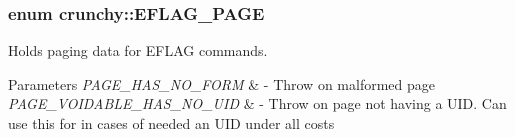 \subsubsection[{E\+F\+L\+A\+G\+\_\+\+P\+A\+G\+E}]{\setlength{\rightskip}{0pt plus 5cm}enum {\bf crunchy\+::\+E\+F\+L\+A\+G\+\_\+\+P\+A\+G\+E}}\label{namespacecrunchy_ad63d9cf0dc471a6e9379c12cd89fb5a9}


Holds paging data for E\+F\+L\+A\+G commands. 


\begin{DoxyParams}{Parameters}
{\em P\+A\+G\+E\+\_\+\+H\+A\+S\+\_\+\+N\+O\+\_\+\+F\+O\+R\+M} & -\/ Throw on malformed page \\
\hline
{\em P\+A\+G\+E\+\_\+\+V\+O\+I\+D\+A\+B\+L\+E\+\_\+\+H\+A\+S\+\_\+\+N\+O\+\_\+\+U\+I\+D} & -\/ Throw on page not having a U\+I\+D. Can use this for in cases of needed an U\+I\+D under all costs \\
\hline
\end{DoxyParams}
